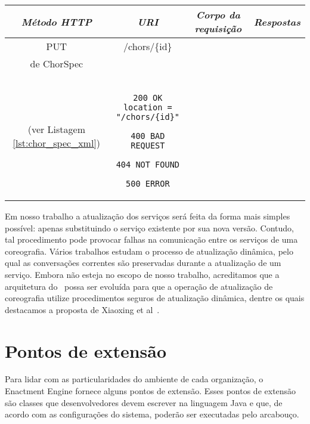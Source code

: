 \begin{description}
{\small
\begin{tabular}{|c|c|c|c|}
\hline 
\itshape{Método HTTP} & \itshape{URI} & \itshape{Corpo da requisição} & \itshape{Respostas} \\ 
\hline 
PUT & /chors/\{id\} & 

\begin{minipage}{2in}
Representação XML \\ de \textsf{ChorSpec}\\ 
(ver Listagem \ref{lst:chor_spec_xml})
\end{minipage} 
&
\begin{minipage}{2in}
\begin{verbatim}

200 OK
location = "/chors/{id}"

400 BAD REQUEST

404 NOT FOUND

500 ERROR

\end{verbatim}
\end{minipage} 
\\ 
\hline 
\end{tabular} 
}

Em nosso trabalho a atualização dos serviços será feita da forma mais simples possível: apenas substituindo o serviço existente por sua nova versão. Contudo, tal procedimento pode provocar falhas na comunicação entre os serviços de uma coreografia. Vários trabalhos \cite{Kramer1990Philosophers, Vandewoude2007Tranquility, Xiaoxing2011VersionConsistent} estudam o processo de atualização dinâmica, pelo qual as conversações correntes são preservadas durante a atualização de um serviço. Embora não esteja no escopo de nosso trabalho, acreditamos que a arquitetura do \ee\ possa ser evoluída para que a operação de atualização de coreografia utilize procedimentos seguros de atualização dinâmica, dentre os quais destacamos a proposta de Xiaoxing et al~\cite{Xiaoxing2011VersionConsistent}.

\end{description}

\section{Pontos de extensão}
\label{sec:extensao}

Para lidar com as particularidades do ambiente de cada organização, o Enactment Engine fornece alguns pontos de extensão. Esses pontos de extensão são classes que desenvolvedores devem escrever na linguagem Java e que, de acordo com as configurações do sistema, poderão ser executadas pelo arcabouço.

